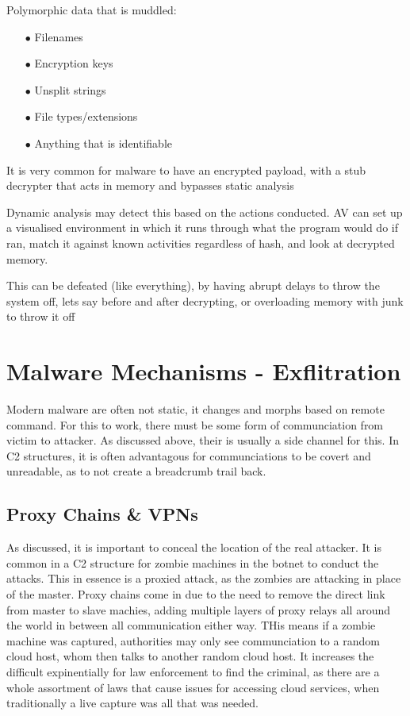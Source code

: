 Polymorphic data that is muddled:
\begin{enumerate}
    \item [$\bullet$]Filenames
    \item [$\bullet$]Encryption keys
    \item [$\bullet$]Unsplit strings
    \item [$\bullet$]File types/extensions
    \item [$\bullet$]Anything that is identifiable
\end{enumerate}

It is very common for malware to have an encrypted payload, with a stub decrypter that acts in memory and bypasses static analysis

Dynamic analysis may detect this based on the actions conducted. AV can set up a visualised environment in which it runs through what the program would do if ran, match it against 
known activities regardless of hash, and look at decrypted memory.

This can be defeated (like everything), by having abrupt delays to throw the system off, lets say before and after decrypting, or overloading memory with junk to throw it off


\chapter{Malware Mechanisms - Exflitration}
Modern malware are often not static, it changes and morphs based on remote command. For this to work, there must be some form of communciation from victim to attacker. As discussed above, their is usually a side channel for this.
In C2 structures, it is often advantagous for communciations to be covert and unreadable, as to not create a breadcrumb trail back. 

\section{Proxy Chains \& VPNs}
As discussed, it is important to conceal the location of the real attacker. It is common in a C2 structure for zombie machines in the botnet to conduct the attacks. This in essence is a proxied attack,
as the zombies are attacking in place of the master. Proxy chains come in due to the need to remove the direct link from master to slave machies, adding multiple layers of proxy relays all around the world 
in between all communication either way. THis means if a zombie machine was captured, authorities may only see communciation to a random cloud host, whom then talks to another random cloud host. It increases the
difficult expinentially for law enforcement to find the criminal, as there are a whole assortment of laws that cause issues for accessing cloud services, when traditionally a live capture was all that was needed. 

